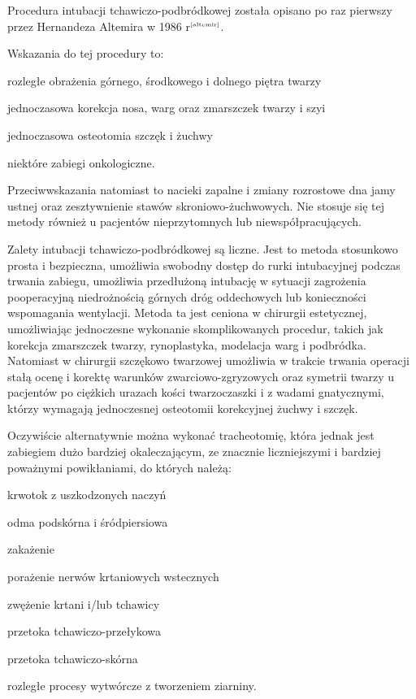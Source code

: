 \documentclass[a4paper, 12pt]{report}
\newcommand\cyt[1]{$^{\tiny{\cite{#1}}}$}
\begin{document}
Procedura intubacji tchawiczo-podbródkowej została opisano po raz
pierwszy przez Hernandeza Altemira w 1986 r\cyt{altemir}. %

Wskazania do tej procedury to:
\begin{inparaenum}
\item rozległe obrażenia górnego, środkowego i dolnego piętra twarzy
\item jednoczasowa korekcja nosa, warg oraz zmarszczek twarzy i szyi 
\item jednoczasowa osteotomia szczęk i żuchwy
\item niektóre zabiegi onkologiczne. 
\end{inparaenum}
Przeciwwskazania natomiast to nacieki zapalne i zmiany rozrostowe dna
jamy ustnej oraz zesztywnienie stawów skroniowo-żuchwowych. Nie
stosuje się tej metody również u pacjentów nieprzytomnych lub
niewspółpracujących.

Zalety intubacji tchawiczo-podbródkowej są liczne. Jest to metoda
stosunkowo prosta i bezpieczna, umożliwia swobodny dostęp do rurki
intubacyjnej podczas trwania zabiegu, umożliwia przedłużoną intubację
w sytuacji zagrożenia pooperacyjną niedrożnością górnych dróg
oddechowych lub konieczności wspomagania wentylacji. Metoda ta jest
ceniona w chirurgii estetycznej, umożliwiając jednoczesne wykonanie
skomplikowanych procedur, takich jak korekcja zmarszczek twarzy,
rynoplastyka, modelacja warg i podbródka. Natomiast w chirurgii
szczękowo twarzowej umożliwia w trakcie trwania operacji stałą ocenę i
korektę warunków zwarciowo-zgryzowych oraz symetrii twarzy u pacjentów
po ciężkich urazach kości twarzoczaszki i z wadami gnatycznymi, którzy
wymagają jednoczesnej osteotomii korekcyjnej żuchwy i szczęk.

Oczywiście alternatywnie można wykonać tracheotomię, która jednak jest
zabiegiem dużo bardziej okaleczającym, ze znacznie liczniejszymi i
bardziej poważnymi powikłaniami, do których należą:
\begin{inparaenum}
\item krwotok z uszkodzonych naczyń
\item odma podskórna i śródpiersiowa
\item zakażenie
\item porażenie nerwów krtaniowych wstecznych
\item zwężenie krtani i/lub tchawicy
\item przetoka tchawiczo-przełykowa
\item przetoka tchawiczo-skórna
\item rozległe procesy wytwórcze z tworzeniem ziarniny.
\end{inparaenum}
\end{document}
